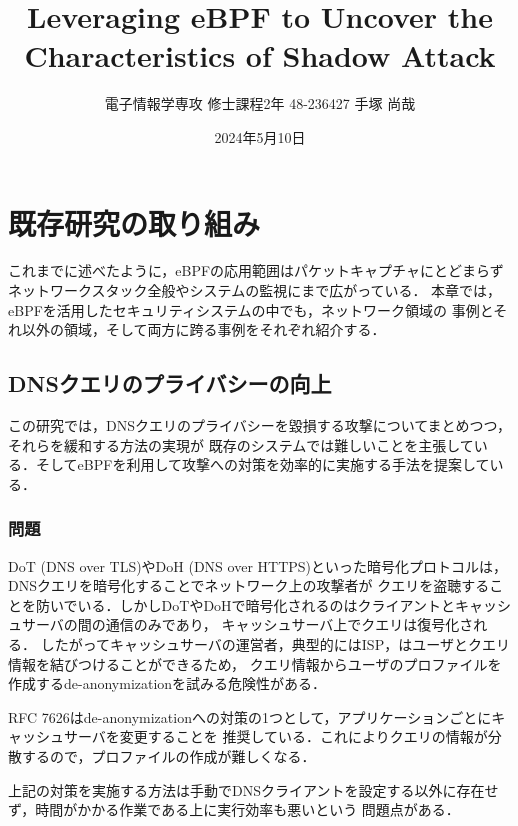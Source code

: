 \documentclass[platex,a4j,10pt,twoside,twocolumn,dvipdfmx]{jsarticle}
\title{Leveraging eBPF to Uncover the Characteristics of Shadow Attack}
\author{電子情報学専攻 修士課程2年 48-236427 手塚 尚哉}
\date{2024年5月10日}
\begin{document}








\section{既存研究の取り組み}
これまでに述べたように，eBPFの応用範囲はパケットキャプチャにとどまらず
ネットワークスタック全般やシステムの監視にまで広がっている．
本章では，eBPFを活用したセキュリティシステムの中でも，ネットワーク領域の
事例とそれ以外の領域，そして両方に跨る事例をそれぞれ紹介する．

\subsection{DNSクエリのプライバシーの向上 \cite{rivera2020leveraging}}
この研究では，DNSクエリのプライバシーを毀損する攻撃についてまとめつつ，それらを緩和する方法の実現が
既存のシステムでは難しいことを主張している．そしてeBPFを利用して攻撃への対策を効率的に実施する手法を提案している．

\subsubsection{問題}
DoT (DNS over TLS)やDoH (DNS over HTTPS)といった暗号化プロトコルは，DNSクエリを暗号化することでネットワーク上の攻撃者が
クエリを盗聴することを防いでいる．しかしDoTやDoHで暗号化されるのはクライアントとキャッシュサーバの間の通信のみであり，
キャッシュサーバ上でクエリは復号化される．
したがってキャッシュサーバの運営者，典型的にはISP，はユーザとクエリ情報を結びつけることができるため，
クエリ情報からユーザのプロファイルを作成するde-anonymizationを試みる危険性がある．

RFC 7626はde-anonymizationへの対策の1つとして，アプリケーションごとにキャッシュサーバを変更することを
推奨している．これによりクエリの情報が分散するので，プロファイルの作成が難しくなる．

上記の対策を実施する方法は手動でDNSクライアントを設定する以外に存在せず，時間がかかる作業である上に実行効率も悪いという
問題点がある．
\end{document}
